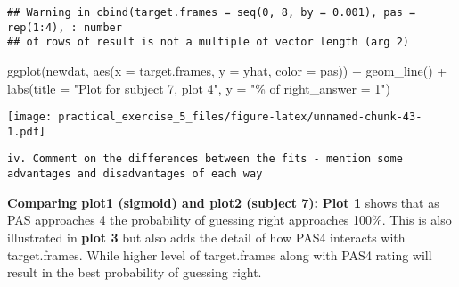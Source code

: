 \documentclass[
]{article}
\newenvironment{Shaded}{\begin{snugshade}}{\end{snugshade}}
\newcommand{\AttributeTok}[1]{\textcolor[rgb]{0.77,0.63,0.00}{#1}}
\newcommand{\FloatTok}[1]{\textcolor[rgb]{0.00,0.00,0.81}{#1}}
\newcommand{\FunctionTok}[1]{\textcolor[rgb]{0.00,0.00,0.00}{#1}}
\newcommand{\NormalTok}[1]{#1}
\newcommand{\OtherTok}[1]{\textcolor[rgb]{0.56,0.35,0.01}{#1}}
\newcommand{\SpecialCharTok}[1]{\textcolor[rgb]{0.00,0.00,0.00}{#1}}
\newcommand{\StringTok}[1]{\textcolor[rgb]{0.31,0.60,0.02}{#1}}
\begin{document}
\begin{verbatim}
## Warning in cbind(target.frames = seq(0, 8, by = 0.001), pas = rep(1:4), : number
## of rows of result is not a multiple of vector length (arg 2)
\end{verbatim}

\begin{Shaded}
\end{Shaded}

\begin{Shaded}
\begin{Highlighting}[]
\FunctionTok{ggplot}\NormalTok{(newdat, }\FunctionTok{aes}\NormalTok{(}\AttributeTok{x =}\NormalTok{ target.frames, }\AttributeTok{y =}\NormalTok{ yhat, }\AttributeTok{color =}\NormalTok{ pas)) }\SpecialCharTok{+} \FunctionTok{geom\_line}\NormalTok{() }\SpecialCharTok{+} \FunctionTok{labs}\NormalTok{(}\AttributeTok{title =} \StringTok{"Plot for subject 7, plot 4"}\NormalTok{, }\AttributeTok{y =} \StringTok{"\% of right\_answer = 1"}\NormalTok{)}
\end{Highlighting}
\end{Shaded}

\texttt{[image: practical\_exercise\_5\_files/figure-latex/unnamed-chunk-43-1.pdf]}

\begin{verbatim}
iv. Comment on the differences between the fits - mention some advantages and disadvantages of each way 
\end{verbatim}

\textbf{Comparing plot1 (sigmoid) and plot2 (subject 7):} \textbf{Plot
1} shows that as PAS approaches 4 the probability of guessing right
approaches 100\%. This is also illustrated in \textbf{plot 3} but also
adds the detail of how PAS4 interacts with target.frames. While higher
level of target.frames along with PAS4 rating will result in the best
probability of guessing right.
\end{document}
